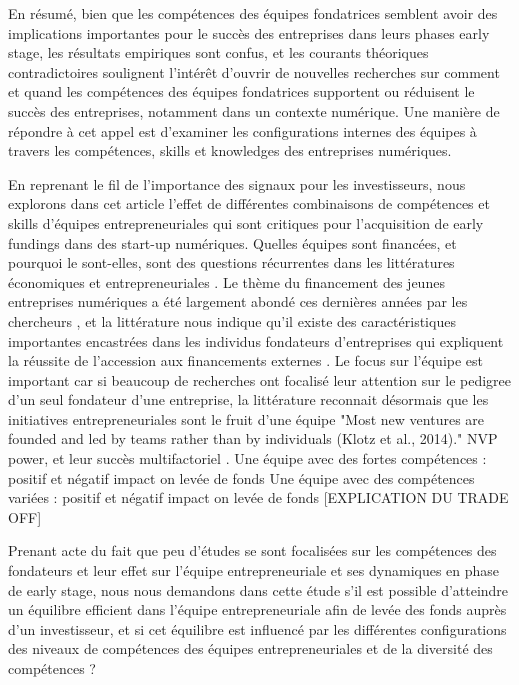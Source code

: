 \documentclass[11pt]{article}
\begin{document}
En résumé, bien que les compétences des équipes fondatrices semblent avoir des implications importantes pour le succès des entreprises dans leurs phases early stage, les résultats empiriques sont confus, et les courants théoriques contradictoires soulignent l'intérêt d'ouvrir de nouvelles recherches sur comment et quand les compétences des équipes fondatrices supportent ou réduisent le succès des entreprises, notamment dans un contexte numérique. Une manière de répondre à cet appel est d'examiner les configurations internes des équipes à travers les compétences, skills et knowledges des entreprises numériques.

En reprenant le fil de l'importance des signaux pour les investisseurs, nous explorons dans cet article l'effet de différentes combinaisons de compétences et skills d'équipes entrepreneuriales qui sont critiques pour l'acquisition de early fundings dans des start-up numériques. Quelles équipes sont financées, et pourquoi le sont-elles, sont des questions récurrentes dans les littératures économiques et entrepreneuriales \citep{knight2020start}. Le thème du financement des jeunes entreprises numériques a été largement abondé ces dernières années par les chercheurs \citep{klein2020start}, et la littérature nous indique qu'il existe des caractéristiques importantes encastrées dans les individus fondateurs d'entreprises qui expliquent la réussite de l'accession aux financements externes \citep{pinelli2020too, reese2020should}. Le focus sur l'équipe est important car si beaucoup de recherches ont focalisé leur attention sur le pedigree d'un seul fondateur d'une entreprise, la littérature reconnait désormais que les initiatives entrepreneuriales sont le fruit d'une équipe "Most new ventures are founded and led by teams rather than by individuals (Klotz et al., 2014)." NVP power, et leur succès multifactoriel \citep{roure1990predictors}.
Une équipe avec des fortes compétences : positif et négatif impact on levée de fonds
Une équipe avec des compétences variées : positif et négatif impact on levée de fonds
[EXPLICATION DU TRADE OFF]

Prenant acte du fait que peu d'études se sont focalisées sur les compétences des fondateurs et leur effet sur l'équipe entrepreneuriale et ses dynamiques en phase de early stage, nous nous demandons dans cette étude s'il est possible d'atteindre un équilibre efficient dans l'équipe entrepreneuriale afin de levée des fonds auprès d'un investisseur, et si cet équilibre est influencé par les différentes configurations des niveaux de compétences des équipes entrepreneuriales et de la diversité des compétences ?
\end{document}
